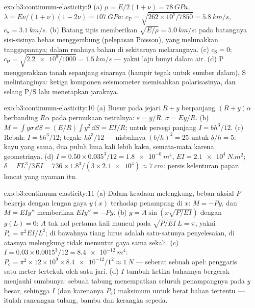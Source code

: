 \begin{solution}{exo:b3:continuum-elasticity:9}
(a) $\mu = E/2(1+\nu) = \qty{78}{GPa}$, $\lambda = E\nu/(1+\nu)(1-2\nu)
= \qty{107}{GPa}$: $c_{\text{P}} = \sqrt{262\times10^9/7850} =
\qty{5.8}{km/s}$, $c_{\text{S}} = \qty{3.1}{km/s}$. (b) Batang tipis
memberikan $\sqrt{E/\rho} = \qty{5.0}{km/s}$: pada batangnya sisi-sisinya
bebas menggembung (pelepasan Poisson), yang melunakkan tanggapannya;
dalam ruahnya bahan di sekitarnya melarangnya. (c) $c_{\text{S}} = 0$;
$c_{\text{P}} = \sqrt{\num{2.2e9}/1000} = \qty{1.5}{km/s}$ --- yakni
laju bunyi dalam air. (d) P menggerakkan tanah sepanjang sinarnya
(hampir tegak untuk sumber dalam), S melintanginya: ketiga komponen
seismometer memisahkan polarisasinya, dan selang P/S lalu menetapkan
jaraknya.
\end{solution}

\begin{solution}{exo:b3:continuum-elasticity:10}
(a) Busur pada jejari $R + y$ berpanjang $(R + y)\alpha$ berbanding
$R\alpha$ pada permukaan netralnya: $\varepsilon = y/R$, $\sigma =
Ey/R$. (b) $M = \int y\sigma\,\dd S = (E/R)\int y^2\,\dd S = EI/R$;
untuk persegi panjang $I = bh^3/12$. (c) Rebah: $I = bh^3/12$; tegak:
$hb^3/12$ --- nisbahnya $(b/h)^2 = 25$ untuk $b/h = 5$: kayu yang sama,
dua puluh lima kali lebih kaku, semata-mata karena geometrinya. (d) $I = 0.50 \times
0.035^3/12 = \qty{1.8e-6}{m^4}$, $EI = \qty{2.1e4}{N.m^2}$; $\delta =
FL^3/3EI = 736 \times 1.8^3/(3 \times \num{2.1e4}) \approx
\qty{7}{cm}$: persis kelenturan papan loncat yang nyaman itu.
\end{solution}

\begin{solution}{exo:b3:continuum-elasticity:11}
(a) Dalam keadaan melengkung, beban aksial $P$ bekerja dengan lengan
gaya $y(x)$ terhadap penampang di $x$: $M = -Py$, dan $M = EIy''$
memberikan $EIy'' = -Py$. (b) $y = A\sin(x\sqrt{P/EI})$ dengan
$y(L) = 0$: $A$ tak nol pertama kali muncul pada
$\sqrt{P/EI}\,L = \pi$, yakni $P_{\text{c}} =
\pi^2EI/L^2$; di bawahnya tiang lurus adalah satu-satunya penyelesaian,
di atasnya melengkung tidak menuntut gaya sama sekali. (c) $I = 0.03 \times 0.0015^3/12 =
\qty{8.4e-12}{m^4}$: $P_{\text{c}} = \pi^2 \times 12\times10^9 \times
\num{8.4e-12}/1^2 \approx \qty{1}{N}$ --- seberat sebuah apel: penggaris
satu meter tertekuk oleh satu jari. (d) $I$ tumbuh ketika bahannya
bergerak menjauhi sumbunya: sebuah tabung menempatkan seluruh
penampangnya pada $y$ besar, sehingga $I$ (dan karenanya
$P_{\text{c}}$) maksimum untuk berat bahan tertentu --- itulah rancangan
tulang, bambu dan kerangka sepeda.
\end{solution}

